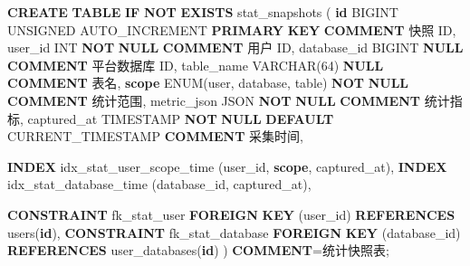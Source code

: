 \documentclass[
  a4paper,
  UTF8]{ctexart}
\newenvironment{Shaded}{}{}
\newcommand{\ControlFlowTok}[1]{\textcolor[rgb]{0.00,0.44,0.13}{\textbf{#1}}}
\newcommand{\DataTypeTok}[1]{\textcolor[rgb]{0.56,0.13,0.00}{#1}}
\newcommand{\DecValTok}[1]{\textcolor[rgb]{0.25,0.63,0.44}{#1}}
\newcommand{\FunctionTok}[1]{\textcolor[rgb]{0.02,0.16,0.49}{#1}}
\newcommand{\KeywordTok}[1]{\textcolor[rgb]{0.00,0.44,0.13}{\textbf{#1}}}
\newcommand{\NormalTok}[1]{#1}
\newcommand{\OperatorTok}[1]{\textcolor[rgb]{0.40,0.40,0.40}{#1}}
\newcommand{\StringTok}[1]{\textcolor[rgb]{0.25,0.44,0.63}{#1}}
\begin{document}
\begin{Shaded}
\begin{Highlighting}[]
\KeywordTok{CREATE} \KeywordTok{TABLE} \ControlFlowTok{IF} \KeywordTok{NOT} \KeywordTok{EXISTS}\NormalTok{ stat\_snapshots (}
  \KeywordTok{id}\NormalTok{ BIGINT UNSIGNED AUTO\_INCREMENT }\KeywordTok{PRIMARY} \KeywordTok{KEY} \KeywordTok{COMMENT} \StringTok{\textquotesingle{}快照 ID\textquotesingle{}}\NormalTok{,}
\NormalTok{  user\_id }\DataTypeTok{INT} \KeywordTok{NOT} \KeywordTok{NULL} \KeywordTok{COMMENT} \StringTok{\textquotesingle{}用户 ID\textquotesingle{}}\NormalTok{,}
\NormalTok{  database\_id BIGINT }\KeywordTok{NULL} \KeywordTok{COMMENT} \StringTok{\textquotesingle{}平台数据库 ID\textquotesingle{}}\NormalTok{,}
\NormalTok{  table\_name }\DataTypeTok{VARCHAR}\NormalTok{(}\DecValTok{64}\NormalTok{) }\KeywordTok{NULL} \KeywordTok{COMMENT} \StringTok{\textquotesingle{}表名\textquotesingle{}}\NormalTok{,}
  \KeywordTok{scope}\NormalTok{ ENUM(}\StringTok{\textquotesingle{}user\textquotesingle{}}\NormalTok{, }\StringTok{\textquotesingle{}database\textquotesingle{}}\NormalTok{, }\StringTok{\textquotesingle{}table\textquotesingle{}}\NormalTok{) }\KeywordTok{NOT} \KeywordTok{NULL} \KeywordTok{COMMENT} \StringTok{\textquotesingle{}统计范围\textquotesingle{}}\NormalTok{,}
\NormalTok{  metric\_json JSON }\KeywordTok{NOT} \KeywordTok{NULL} \KeywordTok{COMMENT} \StringTok{\textquotesingle{}统计指标\textquotesingle{}}\NormalTok{,}
\NormalTok{  captured\_at }\DataTypeTok{TIMESTAMP} \KeywordTok{NOT} \KeywordTok{NULL} \KeywordTok{DEFAULT} \FunctionTok{CURRENT\_TIMESTAMP} \KeywordTok{COMMENT} \StringTok{\textquotesingle{}采集时间\textquotesingle{}}\NormalTok{,}

  \KeywordTok{INDEX}\NormalTok{ idx\_stat\_user\_scope\_time (user\_id, }\KeywordTok{scope}\NormalTok{, captured\_at),}
  \KeywordTok{INDEX}\NormalTok{ idx\_stat\_database\_time (database\_id, captured\_at),}

  \KeywordTok{CONSTRAINT}\NormalTok{ fk\_stat\_user}
    \KeywordTok{FOREIGN} \KeywordTok{KEY}\NormalTok{ (user\_id) }\KeywordTok{REFERENCES}\NormalTok{ users(}\KeywordTok{id}\NormalTok{),}
  \KeywordTok{CONSTRAINT}\NormalTok{ fk\_stat\_database}
    \KeywordTok{FOREIGN} \KeywordTok{KEY}\NormalTok{ (database\_id) }\KeywordTok{REFERENCES}\NormalTok{ user\_databases(}\KeywordTok{id}\NormalTok{)}
\NormalTok{) }\KeywordTok{COMMENT}\OperatorTok{=}\StringTok{\textquotesingle{}统计快照表\textquotesingle{}}\NormalTok{;}
\end{Highlighting}
\end{Shaded}
\end{document}
